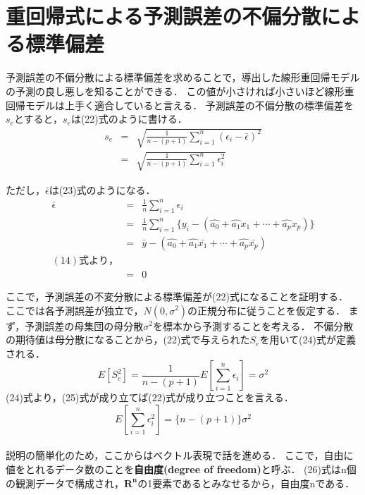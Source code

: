 \documentclass[dvipdfmx]{jsarticle}
\begin{document}
\section{重回帰式による予測誤差の不偏分散による標準偏差}
予測誤差の不偏分散による標準偏差を求めることで，導出した線形重回帰モデルの予測の良し悪しを知ることができる．
この値が小さければ小さいほど線形重回帰モデルは上手く適合していると言える．
予測誤差の不偏分散の標準偏差を$s_e$とすると，$s_e$は(22)式のように書ける．
\begin{eqnarray}
  s_e&=&\sqrt{\frac{1}{n-(p+1)} \sum_{i=1}^n (\epsilon_i-\bar{\epsilon})^2} \nonumber
  \\
  &=&\sqrt{\frac{1}{n-(p+1)}\sum_{i=1}^n \epsilon_i^2}
\end{eqnarray}

ただし，$\bar{\epsilon}$は(23)式のようになる．
\begin{eqnarray}
  \bar{\epsilon}&=&\frac{1}{n} \sum_{i=1}^n \epsilon_i \nonumber
  \\
  &=&\frac{1}{n} \sum_{i=1}^n  \{ y_i - (\hat{a_0}+ \hat{a_1}x_1 + \cdots + \hat{a_p}x_p)\}  \nonumber
  \\
  &=&\bar{y}-(\hat{a_0}+\hat{a_1}\bar{x_1}+\cdots+\hat{a_p}\bar{x_p}) \nonumber
  \\
  (14)式より，\nonumber
  \\
  &=&0
\end{eqnarray}

ここで，予測誤差の不変分散による標準偏差が(22)式になることを証明する．
ここでは各予測誤差が独立で，$N(0, \sigma^2)$の正規分布に従うことを仮定する．
まず，予測誤差の母集団の母分散$\sigma^2$を標本から予測することを考える．
不偏分散の期待値は母分散になることから，(22)式で与えられた$S_e$を用いて(24)式が定義される．
\begin{equation}
  E[S_e^2]=\frac{1}{n-(p+1)}E\left[\sum_{i=1}^n\epsilon_i\right]=\sigma^2
\end{equation}
(24)式より，(25)式が成り立てば(22)式が成り立つことを言える．
\begin{equation}
  E\left[\sum_{i=1}^n\epsilon_i^2\right]=\{n-(p+1)\}\sigma^2
\end{equation}
\\
説明の簡単化のため，ここからはベクトル表現で話を進める．
ここで，自由に値をとれるデータ数のことを\textbf{自由度(degree of freedom)}と呼ぶ．
(26)式はn個の観測データで構成され，$\boldsymbol{R^n}$の1要素であるとみなせるから，自由度nである．
\end{document}
